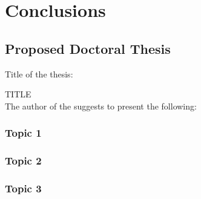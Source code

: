 \chapter{Conclusions}
% 

\section{Proposed Doctoral Thesis}
Title of the thesis:

TITLE
\\
The author of the \thesis{} suggests to present the following:
\subsection{Topic 1}
\subsection{Topic 2}
\subsection{Topic 3}
